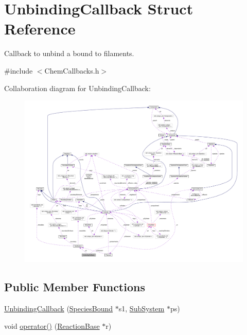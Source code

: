 \hypertarget{structUnbindingCallback}{\section{Unbinding\+Callback Struct Reference}
\label{structUnbindingCallback}
}


Callback to unbind a bound to filaments.  




{\ttfamily \#include $<$Chem\+Callbacks.\+h$>$}



Collaboration diagram for Unbinding\+Callback\+:\nopagebreak
\begin{figure}[H]
\begin{center}
\leavevmode
\includegraphics[width=350pt]{structUnbindingCallback__coll__graph}
\end{center}
\end{figure}
\subsection*{Public Member Functions}
\begin{DoxyCompactItemize}
\item 
\hyperlink{structUnbindingCallback_af56dfa37467fed8f79f345b8ab85fedd}{Unbinding\+Callback} (\hyperlink{classSpeciesBound}{Species\+Bound} $\ast$s1, \hyperlink{classSubSystem}{Sub\+System} $\ast$ps)
\item 
void \hyperlink{structUnbindingCallback_a9e2633d821ddd1442cb89561f3212eab}{operator()} (\hyperlink{classReactionBase}{Reaction\+Base} $\ast$r)
\end{DoxyCompactItemize}
